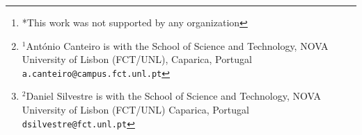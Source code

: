 \documentclass[letterpaper,10pt,conference]{ieeeconf}
\begin{document}
\author{António Canteiro$^{1}$ and Daniel Silvestre$^{2}$%
\thanks{*This work was not supported by any organization}%
\thanks{$^{1}$António Canteiro is with the School of Science and Technology, NOVA University of Lisbon (FCT/UNL),
        Caparica, Portugal
        {\tt\small a.canteiro@campus.fct.unl.pt}}%
\thanks{$^{2}$Daniel Silvestre is with the School of Science and Technology, NOVA University of Lisbon (FCT/UNL)
        Caparica, Portugal
        {\tt\small dsilvestre@fct.unl.pt}}%
}


\maketitle

\begin{abstract}
In the reach-avoid scenario in which a defender quad-rotor UAV is preventing an attacking UAV from reaching a critical area, the defender controller must be formulated so that it enforces the defense conditions tractably.
%
%
NMPC-based controllers are used in scenarios with non-linear dynamics
due to the flexibility of the NMPC objective function and trajectory planning. However, defense conditions are typically formulated using reachable sets, which is challenging to reconcile with the NMPC objective, a differentiable scalar function.

This work proposes a novel NMPC-based defender controller that optimizes the trajectory to best enforce the defense condition derived from the attacker and defender reachable sets. By combining a parametric reachable set framework with the Kullback-Leibler Divergence, the set operations that characterize the defense strategy are expressed as a scalar valued objective function. Additionally, this approach was validated in a
simulated environment in MATLAB.


\end{abstract}
\end{document}
